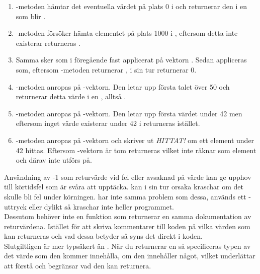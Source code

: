 \begin{enumerate}
\item {}-metoden hämtar det eventuella värdet på plats 0  i  och returnerar den i en  som blir .
\item {}-metoden försöker hämta elementet på plats 1000 i , eftersom detta inte existerar returneras .
\item  Samma sker som i föregående fast applicerat på vektorn . Sedan appliceras  som, eftersom -metoden returnerar , i sin tur returnerar 0.
\item {}-metoden anropas på -vektorn. Den letar upp första talet över 50 och returnerar detta värde i en , alltså .
\item {}-metoden anropas på -vektorn. Den letar upp första värdet under 42 men eftersom inget värde existerar under 42 i  returneras  istället.
\item {}-metoden anropas på -vektorn och skriver ut \textit{HITTAT!} om ett element under 42 hittas. Eftersom -vektorn är tom returneras  vilket  inte räknar som element och därav inte utförs på.
\end{enumerate}

\SubtaskSolved  Användning av -1 som returvärde vid fel eller avsaknad på värde kan ge upphov till körtidsfel som är svåra att upptäcka.  kan i sin tur orsaka kraschar om det skulle bli fel under körningen.  har inte samma problem som dessa, används ett -uttryck eller dylikt så kraschar inte heller programmet.\\
Dessutom behöver inte en funktion som returnerar en  samma dokumentation av returvärdena. Istället för att skriva kommentarer till koden på vilka värden som kan returneras och vad dessa betyder så syns det direkt i koden.\\
Slutgiltligen är  mer typsäkert än . När du returnerar en  så specificeras typen av det värde som den kommer innehålla, om den innehåller något, vilket underlättar att förstå och begränsar vad den kan returnera.



\QUESTEND







